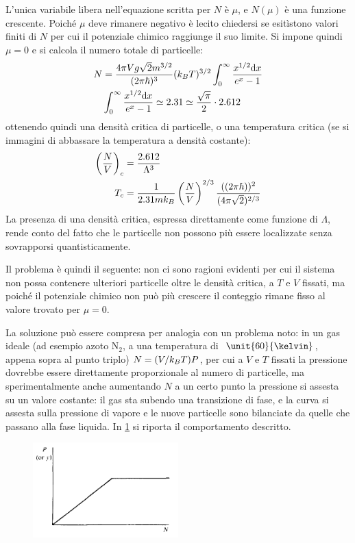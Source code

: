 L'unica variabile libera nell'equazione scritta per $ N $ è $ \mu $, e $ N(\mu) $ è una funzione crescente. Poiché $\mu$ deve rimanere negativo è lecito chiedersi se esitìstono valori finiti di $ N $ per cui il potenziale chimico raggiunge il suo limite. Si impone quindi $ \mu = 0$ e si calcola il numero totale di particelle:
\begin{align*}
N &=  \frac{4\pi V g \sqrt{2} m^{3/2}}{(2\pi \hbar)^3} (k_B T)^{3/2} \int_{0}^{\infty}  \frac{x^{1/2} \dd x}{ e^x - 1}\\
&\int_{0}^{\infty}  \frac{x^{1/2} \dd x}{ e^x - 1} \simeq 2.31 \simeq \frac{\sqrt{\pi}}{2} \cdot 2.612
\end{align*}
ottenendo quindi una densità critica di particelle, o una temperatura critica (se si immagini di abbassare la temperatura a densità costante):
\begin{align*}
\left(\frac{N}{V}\right)_c &= \frac{2.612}{\Lambda^3}\\
T_c &= \frac{1}{2.31 m k_B} \left(\frac{N}{V}\right)^{2/3} \frac{((2\pi \hbar))^2}{(4\pi \sqrt{2})^{2/3}}
\end{align*}
La presenza di una densità critica, espressa direttamente come funzione di $\Lambda$, rende conto del fatto che le particelle non possono più essere localizzate senza sovrapporsi quantisticamente.
\newline

Il problema è quindi il seguente: non ci sono ragioni evidenti per cui il sistema non possa contenere ulteriori particelle oltre le densità critica, a $ T $ e $ V $ fissati, ma poiché il potenziale chimico non può più crescere il conteggio rimane fisso al valore trovato per $ \mu = 0 $.

La soluzione può essere compresa per analogia con un problema noto: in un gas ideale (ad esempio azoto N$_2$, a una temperatura di $ ~\unit{60}{\kelvin} $, appena sopra al punto triplo) $N = (V/k_B T) P$, per cui a $ V $ e $ T $ fissati la pressione dovrebbe essere direttamente proporzionale al numero di particelle, ma sperimentalmente anche aumentando $ N $ a un certo punto la pressione si assesta su un valore costante: il gas sta subendo una transizione di fase, e la curva si assesta sulla pressione di vapore e le nuove particelle sono bilanciate da quelle che passano alla fase liquida. In \cref{fig:gastoliquid} si riporta il comportamento descritto.

\begin{figure}[t]
	\centering
	\includegraphics[width=0.5\textwidth]{Immagini/GasToLiquid.png}
	\vspace{-10pt}
	\caption{}
	\label{fig:gastoliquid}
	\vspace{-10pt}
\end{figure}


